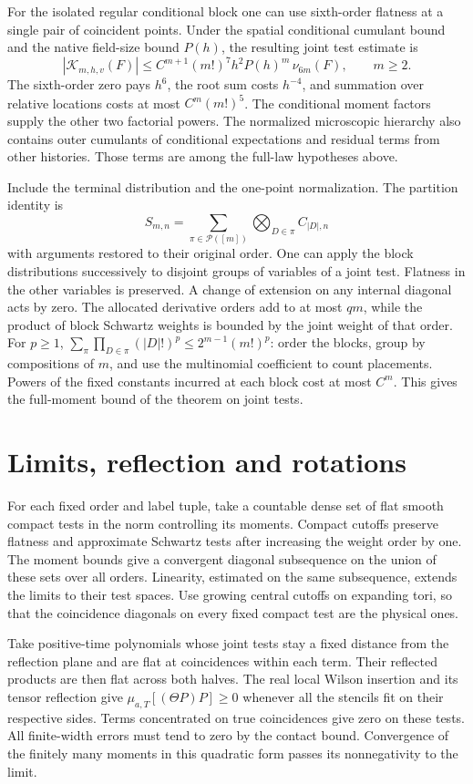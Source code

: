 \documentclass[11pt,letterpaper]{article}
\begin{document}
For the isolated regular conditional block one can use sixth-order
flatness at a single pair of coincident points. Under the spatial
conditional cumulant bound and the native field-size bound \(P(h)\),
the resulting joint test estimate is
\[
 |\mathcal K_{m,h,v}(F)|
 \le C^{m+1}(m!)^7 h^2 P(h)^m\,\nu_{6m}(F),\qquad m\ge2.
\]
The sixth-order zero pays \(h^6\), the root sum costs \(h^{-4}\),
and summation over relative locations costs at most \(C^m(m!)^5\).
The conditional moment factors supply the other two factorial powers.
The normalized microscopic hierarchy also contains outer cumulants
of conditional expectations and residual terms from other histories.
Those terms are among the full-law hypotheses above.

Include the terminal distribution and the one-point normalization.
The partition identity is
\[
       S_{m,n}=\sum_{\pi\in\mathcal P([m])}
              \bigotimes_{D\in\pi} C_{|D|,n}
\]
with arguments restored to their original order. One can apply the block
distributions successively to disjoint groups of variables of a joint
test. Flatness in the other variables is preserved. A change of extension
on any internal diagonal acts by zero. The allocated derivative orders
add to at most \(qm\), while the product of block Schwartz weights is
bounded by the joint weight of that order. For \(p\ge1\),
\(\sum_\pi\prod_{D\in\pi}(|D|!)^p\le 2^{m-1}(m!)^p\):
order the blocks, group by compositions of \(m\), and use the multinomial
coefficient to count placements. Powers of the fixed constants incurred
at each block cost at most \(C^m\). This gives the full-moment bound of
the theorem on joint tests.

\section{Limits, reflection and rotations}

For each fixed order and label tuple, take a countable dense set of flat
smooth compact tests in the norm controlling its moments. Compact cutoffs
preserve flatness and approximate Schwartz tests after increasing the
weight order by one. The moment bounds give a convergent diagonal
subsequence on the union of these sets over all orders. Linearity,
estimated on the same subsequence, extends the limits to their test spaces.
Use growing central cutoffs on expanding tori, so that the coincidence
diagonals on every fixed compact test are the physical ones.

Take positive-time polynomials whose joint tests stay a fixed distance
from the reflection plane and are flat at coincidences within each term.
Their reflected products are then flat across both halves. The real local
Wilson insertion and its tensor reflection give
\(\mu_{a,T}[(\Theta P)P]\ge0\) whenever all the stencils fit on their
respective sides. Terms concentrated on true coincidences give zero on
these tests. All finite-width errors must tend to zero by the contact
bound. Convergence of the finitely many moments in this quadratic form
passes its nonnegativity to the limit.
\end{document}
